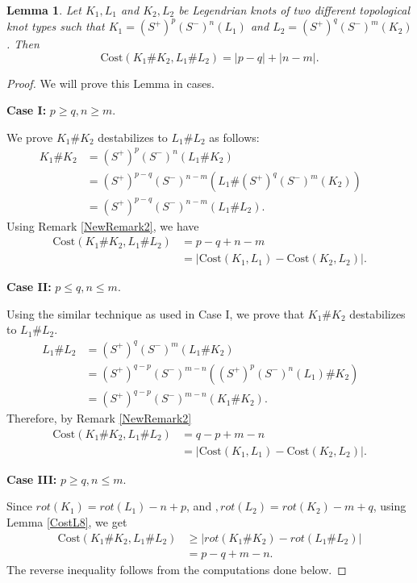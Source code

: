 \documentclass[11pt]{amsart}
\numberwithin{equation}{section}
\theoremstyle{plain}
\newtheorem{Lemma}[equation]{Lemma}
\theoremstyle{definition}
\theoremstyle{remark} \newtheorem{remark}[equation]{Remark}
\theoremstyle{remark} \newtheorem{observation}[equation]{Observation}
\newcommand{\Cost}{\text{Cost}}
\begin{document}
\begin{Lemma}\label{CostL21}
Let $K_1,L_1$ and $K_2,L_2$ be Legendrian knots of two different topological knot types such that $K_1=(S^+)^p(S^-)^n(L_1)$ and $ L_2=(S^+)^q(S^-)^{m}(K_2)$. Then $$\Cost(K_1\#K_2,L_1\#L_2)=|p-q|+|n-m|.$$
\end{Lemma}
\begin{proof}
We will prove this Lemma in cases. 
    
    \noindent \textbf{Case I:} $p\geq q,n\geq m$.
    
  \noindent We prove $K_1\#K_2$ destabilizes to $L_1\#L_2$ as follows:
   \begin{align*}
       K_1\#K_2&=(S^+)^p(S^-)^n(L_1\#K_2)\\
       &=(S^+)^{p-q}(S^-)^{n-m}(L_1\#(S^+)^q(S^-)^{m}(K_2))\\
       &=(S^+)^{p-q}(S^-)^{n-m}(L_1\#L_2).&&
   \end{align*} 
   Using Remark \ref{NewRemark2}, we have
   \begin{align*}
       \Cost(K_1\#K_2,L_1\#L_2)&=p-q+n-m\\
       &=|\Cost(K_1,L_1)-\Cost(K_2,L_2)|.
   \end{align*}
   
 \noindent \textbf{Case II:} $p\leq q,n\leq m$.

   \noindent Using the similar technique as used in Case I, we prove that $K_1\#K_2$ destabilizes to $L_1\#L_2$.
   \begin{align*}
       L_1\#L_2&=(S^+)^q(S^-)^{m}(L_1\#K_2)\\
       &=(S^+)^{q-p}(S^-)^{m-n}((S^+)^p(S^-)^n(L_1)\#K_2)\\
       &=(S^+)^{q-p}(S^-)^{m-n}(K_1\#K_2).&&
   \end{align*} 
   Therefore, by Remark \ref{NewRemark2}
   \begin{align*}
       \Cost(K_1\#K_2,L_1\#L_2)&=q-p+m-n\\
       &=|\Cost(K_1,L_1)-\Cost(K_2,L_2)|.
   \end{align*}

   \noindent \textbf{Case III:} $p\geq q,n\leq m$.

\noindent Since $ rot(K_1)=rot(L_1)-n+p$, and $,rot(L_2)=rot(K_2)-m+q$, using Lemma \ref{CostL8}, we get
\begin{align*}
    \Cost(K_1\#K_2,L_1\#L_2)&\geq |rot(K_1\#K_2)-rot(L_1\#L_2)|\\
    &=p-q+m-n.
\end{align*}
The reverse inequality follows from the computations done below. 


\end{proof}
\end{document}

